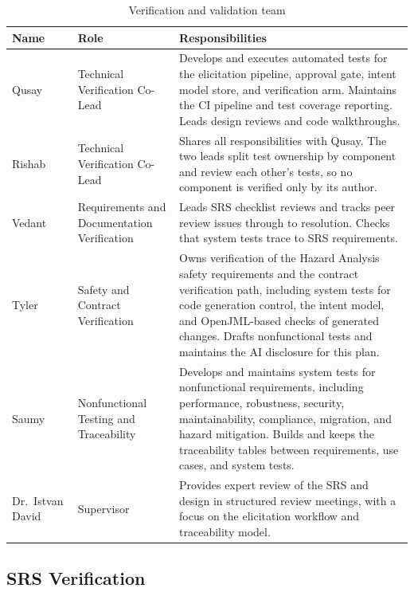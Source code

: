 \documentclass[12pt, titlepage]{article}
\begin{document}
\begin{table}[H]
  \centering
  \renewcommand{\arraystretch}{1.3}
  \begin{tabularx}{\textwidth}{|p{3cm}|p{3.2cm}|X|}
  \hline
  \textbf{Name} & \textbf{Role} & \textbf{Responsibilities} \\
  \hline
  Qusay & Technical Verification Co-Lead &
  Develops and executes automated tests for the elicitation pipeline,
  approval gate, intent model store, and verification arm. Maintains the
  CI pipeline and test coverage reporting. Leads design reviews and code
  walkthroughs. \\
  \hline
  Rishab & Technical Verification Co-Lead &
  Shares all responsibilities with Qusay. The two leads split test
  ownership by component and review each other's tests, so no component
  is verified only by its author. \\
  \hline
  Vedant & Requirements and Documentation Verification &
  Leads SRS checklist reviews and tracks peer review issues through to
  resolution. Checks that system tests trace to SRS requirements. \\
  \hline
  Tyler & Safety and Contract Verification &
  Owns verification of the Hazard Analysis safety requirements and the
  contract verification path, including system tests for code generation
  control, the intent model, and OpenJML-based checks of generated changes.
  Drafts nonfunctional tests and maintains the AI disclosure for this plan. \\
  \hline
  Saumy & Nonfunctional Testing and Traceability &
  Develops and maintains system tests for nonfunctional requirements,
  including performance, robustness, security, maintainability, compliance,
  migration, and hazard mitigation. Builds and keeps the traceability
  tables between requirements, use cases, and system tests. \\
  \hline
  Dr.\ Istvan David & Supervisor &
  Provides expert review of the SRS and design in structured review
  meetings, with a focus on the elicitation workflow and traceability
  model. \\
  \hline
  \end{tabularx}
  \caption{Verification and validation team}
  \label{tab:vnv-team}
  \end{table}

\subsection{SRS Verification}
\end{document}
